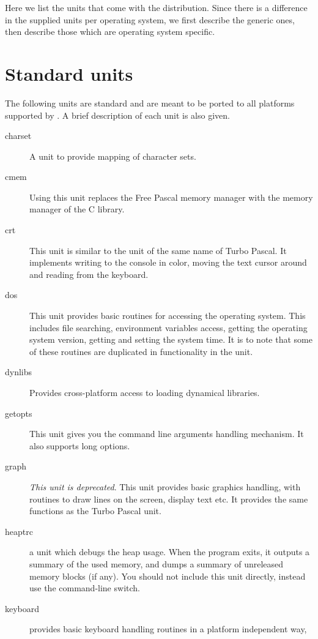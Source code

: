 Here we list the units that come with the \fpc distribution. Since there is
a difference in the supplied units per operating system, we first describe
the generic ones, then describe those which are operating system specific.

%
%
\section{Standard units}

The following units are standard and are meant to be ported to
all platforms supported by \fpc. A brief description of each unit
is also given.

\begin{description}
\item[charset] A unit to provide mapping of character sets.
\item[cmem] Using this unit replaces the Free Pascal memory manager with the
memory manager of the C library.
\item[crt] This unit is similar to the unit of the same name of
Turbo Pascal. It implements writing to the console in color, moving the
text cursor around and reading from the keyboard.
\item[dos] This unit provides basic routines for accessing the operating
system. This includes file searching, environment variables access,
getting the operating system version, getting and setting the
system time. It is to note that some of these routines are duplicated
in functionality in the  unit.
\item[dynlibs] Provides cross-platform access to loading dynamical libraries.
\item[getopts] This unit gives you the \gnu {} command line
arguments handling mechanism. It also supports long options.
\item[graph] \emph{This unit is deprecated}. This unit provides basic graphics handling, with routines to
draw lines on the screen, display text etc. It provides the same functions
as the Turbo Pascal unit.
\item[heaptrc] a unit which debugs the heap usage. When the program exits, it outputs a summary of the used memory, and dumps a summary of unreleased memory blocks (if any).
You should not include this unit directly, instead use the  command-line switch.
\item[keyboard] provides basic keyboard handling routines in a platform independent way,

\end{description}
